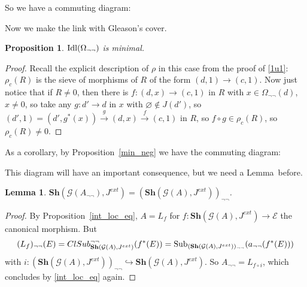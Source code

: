 \documentclass{article}
\newtheorem{Lemma}[theorem]{Lemma}
\newtheorem{proposition}[theorem]{Proposition}
\begin{document}
So we have a commuting diagram:
\begin{center}
\end{center}

Now we make the link with Gleason's cover.
\begin{proposition}
    $\textup{Idl}(\Omega_{\neg\neg})$ is minimal.
\end{proposition}
\begin{proof}
    Recall the explicit description of $\rho$ in this case from the proof of \ref{1u1}: $\rho_c(R)$ is the sieve of morphisms of $R$ of the form $(d,1)\xrightarrow{}(c,1)$. Now just notice that if $R\ne 0$, then there is $f:(d,x)\xrightarrow{}(c,1)$ in $R$ with $x\in\Omega_{\neg\neg}(d)$, $x\ne 0$, so take any $g:d'\xrightarrow{}d$ in $x$ with $\varnothing\not\in J(d')$, so $(d',1)=(d',g^*(x))\xrightarrow{g}(d,x)\xrightarrow{f}(c,1)$ in $R$, so $f\circ g\in\rho_c(R)$, so $\rho_c(R)\ne 0$.
\end{proof}
As a corollary, by Proposition~\ref{min_neg} we have the commuting diagram:
\begin{center}
\end{center}
This diagram will have an important consequence, but we need a Lemma~before.

\begin{Lemma}
    $\mathbf{Sh}(\mathcal{G}(A_{\neg\neg}),J^{ext})=(\mathbf{Sh}(\mathcal{G}(A),J^{ext}))_{\neg\neg}$.
\end{Lemma}
\begin{proof}
    By Proposition~\ref{int_loc_eq}, $A=L_f$ for $f:\mathbf{Sh}(\mathcal{G}(A),J^{ext})\xrightarrow{}\mathcal{E}$ the canonical morphism. But $$(L_f)_{\neg\neg}(E)=ClSub^{\neg\neg}_{\mathbf{Sh}(\mathcal{G}(A),J^{ext})}(f^*(E))=\textup{Sub}_{(\mathbf{Sh}(\mathcal{G}(A),J^{ext}))_{\neg\neg}}(a_{\neg\neg}(f^*(E)))$$
    with $i:(\mathbf{Sh}(\mathcal{G}(A),J^{ext}))_{\neg\neg}\hookrightarrow{}\mathbf{Sh}(\mathcal{G}(A),J^{ext})$. So $A_{\neg\neg}=L_{f\circ i}$, which concludes by \ref{int_loc_eq} again.  
\end{proof}
\end{document}
